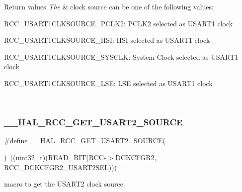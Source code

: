 \begin{DoxyRetVals}{Return values}
{\em The} & clock source can be one of the following values\+: \begin{DoxyItemize}
\item R\+C\+C\+\_\+\+U\+S\+A\+R\+T1\+C\+L\+K\+S\+O\+U\+R\+C\+E\+\_\+\+P\+C\+L\+K2\+: P\+C\+L\+K2 selected as U\+S\+A\+R\+T1 clock \item R\+C\+C\+\_\+\+U\+S\+A\+R\+T1\+C\+L\+K\+S\+O\+U\+R\+C\+E\+\_\+\+H\+SI\+: H\+SI selected as U\+S\+A\+R\+T1 clock \item R\+C\+C\+\_\+\+U\+S\+A\+R\+T1\+C\+L\+K\+S\+O\+U\+R\+C\+E\+\_\+\+S\+Y\+S\+C\+LK\+: System Clock selected as U\+S\+A\+R\+T1 clock \item R\+C\+C\+\_\+\+U\+S\+A\+R\+T1\+C\+L\+K\+S\+O\+U\+R\+C\+E\+\_\+\+L\+SE\+: L\+SE selected as U\+S\+A\+R\+T1 clock \end{DoxyItemize}
\\
\hline
\end{DoxyRetVals}
\mbox{\label{group___r_c_c_ex___exported___macros_ga7f2fecdd9f75bb71677602f9b2c22dd7}} 
\subsubsection{\texorpdfstring{\_\_HAL\_RCC\_GET\_USART2\_SOURCE}{\_\_HAL\_RCC\_GET\_USART2\_SOURCE}}
{\footnotesize\ttfamily \#define \+\_\+\+\_\+\+H\+A\+L\+\_\+\+R\+C\+C\+\_\+\+G\+E\+T\+\_\+\+U\+S\+A\+R\+T2\+\_\+\+S\+O\+U\+R\+CE(\begin{DoxyParamCaption}{ }\end{DoxyParamCaption})~((uint32\+\_\+t)(R\+E\+A\+D\+\_\+\+B\+IT(R\+CC-\/$>$D\+C\+K\+C\+F\+G\+R2, R\+C\+C\+\_\+\+D\+C\+K\+C\+F\+G\+R2\+\_\+\+U\+S\+A\+R\+T2\+S\+EL)))}



macro to get the U\+S\+A\+R\+T2 clock source. 


